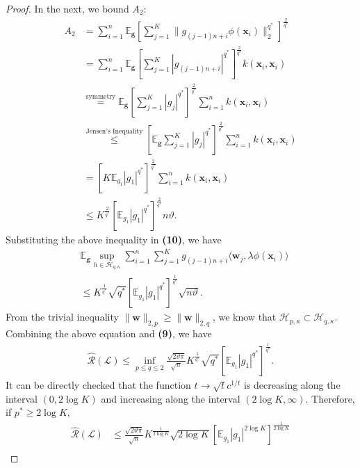 \documentclass[10pt]{llncs}
\begin{document}
\begin{proof}
  In the next, we bound $A_2$:
  \begin{align*}
    A_2&=\sum_{i=1}^n\mathbb{E}_{\bm g}\left[\sum_{j=1}^K\|g_{(j-1)n+i}\phi(\mathbf x_i)\|_2^{q^\ast}\right]^{\frac{2}{q^\ast}}\\
    &=\sum_{i=1}^n\mathbb{E}_{\bm g}\left[\sum_{j=1}^K|g_{(j-1)n+i}|^{q^\ast}\right]^{\frac{2}{q^\ast}}k(\mathbf x_i,\mathbf x_i)\\
    &\overset{\text{symmetry}}{=}\mathbb{E}_{\bm g}\left[\sum_{j=1}^K|g_{j}|^{q^\ast}\right]^{\frac{2}{q^\ast}}\sum_{i=1}^nk(\mathbf x_i,\mathbf x_i)\\
    &\overset{\text{Jensen's Inequality}}{\leq}
    \left[\mathbb{E}_{\bm g} \sum_{j=1}^K|g_{j}|^{q^\ast}\right]^{\frac{2}{q^\ast}}\sum_{i=1}^nk(\mathbf x_i,\mathbf x_i)\\
    &=\left[K\mathbb{E}_{g_1}|g_1|^{q^\ast}\right]^{\frac{2}{q^\ast}}\sum_{i=1}^nk(\mathbf x_i,\mathbf x_i)\\
    &\leq K^{\frac{2}{q^\ast}}\left[\mathbb{E}_{g_1}|g_1|^{q^\ast}\right]^{\frac{2}{q^\ast}}n\vartheta.
  \end{align*}
  Substituting the above inequality in \textbf{(10)}, we have
  \begin{align*}
    &\mathbb{E}_{\bm g}\sup_{h\in \mathcal{H}_{q,\kappa}}\sum_{i=1}^n\sum_{j=1}^Kg_{(j-1)n+i}\langle \mathbf w_j,\lambda \phi(\mathbf x_i)\rangle\\
    &\leq  K^{\frac{1}{q^\ast}}\sqrt{q^\ast}\left[\mathbb{E}_{g_1}|g_1|^{q^\ast}\right]^\frac{1}{q^\ast}\sqrt{n\vartheta}.
  \end{align*}
  From the trivial inequality $\|\mathbf w\|_{2,p}\geq \|\mathbf w\|_{2,q}$,
  we know that $\mathcal{H}_{p,\kappa}\subset \mathcal{H}_{q,\kappa}$.
  Combining the above  equation and \textbf{(9)},
  we have
  \begin{align*}
    \hat{\mathcal{R}}(\mathcal{L})\leq\inf_{p\leq q\leq 2}\frac{\sqrt{2\vartheta\pi}}{\sqrt{n}} K^{\frac{1}{q^\ast}}\sqrt{q^\ast}
    \left[\mathbb{E}_{g_1}|g_1|^{q^\ast}\right]^\frac{1}{q^\ast}.
  \end{align*}
  It can be directly checked that the function $t\rightarrow \sqrt{t}c^{1/t}$ is decreasing along the interval $(0,2\log K)$
  and increasing along the interval $(2\log K,\infty)$.
  Therefore, if $p^\ast\geq 2\log K$,
  \begin{align}
  \label{eq-hai}
    \nonumber\hat{\mathcal{R}}(\mathcal{L})&\leq \frac{\sqrt{2\vartheta\pi}}{\sqrt{n}} K^{\frac{1}{2\log K }}\sqrt{2\log K}
     \left[\mathbb{E}_{g_1}|g_1|^{2\log K}\right]^\frac{1}{2\log K}\\

\end{align}
\end{proof}
\end{document}

